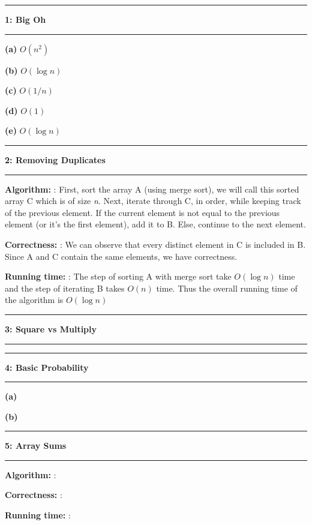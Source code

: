 \documentclass[11pt]{article}
\newcommand\question[2]{\vspace{.25in}\hrule\textbf{#1: #2}\vspace{.5em}\hrule\vspace{.10in}}
\renewcommand\part[1]{\vspace{.10in}\textbf{(#1)}}
\newcommand\algorithm{\vspace{.10in}\textbf{Algorithm: }}
\newcommand\correctness{\vspace{.10in}\textbf{Correctness: }}
\newcommand\runtime{\vspace{.10in}\textbf{Running time: }}
\begin{document}
\raggedright

\newcommand\NAME{Jake Pitkin}
\newcommand\UID{u0891770}
\newcommand\HWNUM{0}

\question{1}{Big Oh}
\part{a} $O(n^2)$

\part{b} $O(\log n)$

\part{c} $O(1/n)$

\part{d} $O(1)$

\part{e} $O(\log n)$

\question{2}{Removing Duplicates} 

\algorithm: First, sort the array A (using merge sort), we will call this sorted array C which is of size \emph{n}.  Next, iterate through C, in order, while keeping track of the previous element. If the current element is not equal to the previous element (or it's the first element), add it to B. Else, continue to the next element.

\correctness: We can observe that every distinct element in C is included in B. Since A and C contain the same elements, we have correctness.

\runtime: The step of sorting A with merge sort take $O(\log n)$ time and the step of iterating B takes $O(n)$ time. Thus the overall running time of the algorithm is $O(\log n)$

\question{3}{Square vs Multiply}


\question{4}{Basic Probability}

\part{a}

\part{b}

\question{5}{Array Sums}

\algorithm: 

\correctness: 

\runtime: 
\end{document}
